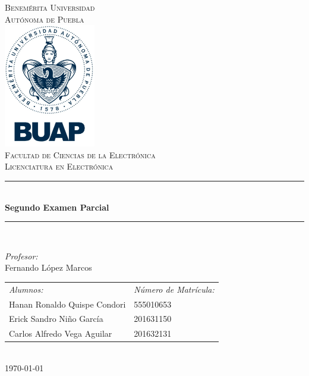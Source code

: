 \documentclass[12pt]{article}
\date{\today}
\begin{document}
\begin{titlepage}
\newcommand{\HRule}{\rule{\linewidth}{0.5mm}} 
\center
\textsc{\LARGE  Benemérita Universidad \\[0.2cm] Autónoma de Puebla}\\[1.5cm] 
\includegraphics[width=4cm]{escudo.jpg}\\[1cm]
\textsc{\Large Facultad de Ciencias de la Electrónica}\\[0.5cm] 
\textsc{\large Licenciatura en Electrónica}\\[0.5cm]
\HRule \\[0.4cm]
{ \huge \bfseries Segundo Examen Parcial }\\[0.4cm] 
\HRule \\[1.5cm]
\begin{minipage}{\textwidth}
\center 

\emph{Profesor:} \\
Fernando López Marcos \\[1cm]

\begin{tabular}{ll}
\emph{Alumnos:} & \emph{Número de Matrícula:}\\
Hanan Ronaldo Quispe Condori  & 555010653 \\
Erick Sandro Niño García & 201631150\\
Carlos Alfredo Vega Aguilar & 201632131 \\
\end{tabular}
\end{minipage}\\[2cm]
\today
\end{titlepage}



\end{document}
